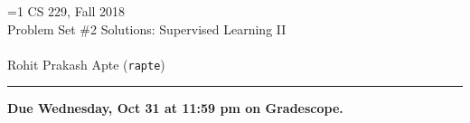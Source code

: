 \documentclass{article}
\def\solutions{1}
\newcommand{\ruleskip}{\bigskip\hrule\bigskip}
\begin{document}
\pagestyle{myheadings} 

\ifnum\solutions=1 {
{\huge\noindent CS 229, Fall 2018\\
Problem Set \#2 Solutions: Supervised Learning II}\\\\
Rohit Prakash Apte (\texttt{rapte})
}  \fi

\ruleskip

{\bf Due Wednesday, Oct 31 at 11:59 pm on Gradescope.}

\medskip



\begin{enumerate}[wide, labelwidth=!, labelindent=0pt]













\end{enumerate}
\end{document}
